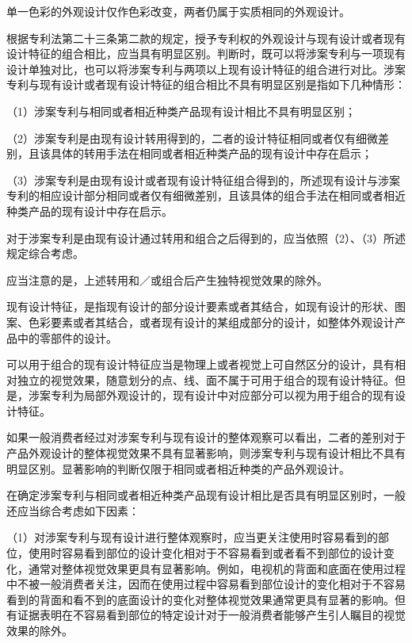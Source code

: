 单一色彩的外观设计仅作色彩改变，两者仍属于实质相同的外观设计。

根据专利法第二十三条第二款的规定，授予专利权的外观设计与现有设计或者现有设计特征的组合相比，应当具有明显区别。判断时，既可以将涉案专利与一项现有设计单独对比，也可以将涉案专利与两项以上现有设计特征的组合进行对比。涉案专利与现有设计或者现有设计特征的组合相比不具有明显区别是指如下几种情形：

{\setlength{\parindent}{17.1bp}（1）涉案专利与相同或者相近种类产品现有设计相比不具有明显区别；\par}

{\setlength{\parindent}{17.1bp}（2）涉案专利是由现有设计转用得到的，二者的设计特征相同或者仅有细微差别，且该具体的转用手法在相同或者相近种类产品的现有设计中存在启示；\par}

{\setlength{\parindent}{17.1bp}（3）涉案专利是由现有设计或者现有设计特征组合得到的，所述现有设计与涉案专利的相应设计部分相同或者仅有细微差别，且该具体的组合手法在相同或者相近种类产品的现有设计中存在启示。\par}

对于涉案专利是由现有设计通过转用和组合之后得到的，应当依照（2）、（3）所述规定综合考虑。

应当注意的是，上述转用和／或组合后产生独特视觉效果的除外。

现有设计特征，是指现有设计的部分设计要素或者其结合，如现有设计的形状、图案、色彩要素或者其结合，或者现有设计的某组成部分的设计，如整体外观设计产品中的零部件的设计。

可以用于组合的现有设计特征应当是物理上或者视觉上可自然区分的设计，具有相对独立的视觉效果，随意划分的点、线、面不属于可用于组合的现有设计特征。但是，涉案专利为局部外观设计的，现有设计中对应部分可以视为用于组合的现有设计特征。

如果一般消费者经过对涉案专利与现有设计的整体观察可以看出，二者的差别对于产品外观设计的整体视觉效果不具有显著影响，则涉案专利与现有设计相比不具有明显区别。显著影响的判断仅限于相同或者相近种类的产品外观设计。

在确定涉案专利与相同或者相近种类产品现有设计相比是否具有明显区别时，一般还应当综合考虑如下因素：

{\setlength{\parindent}{17.1bp}（1）对涉案专利与现有设计进行整体观察时，应当更关注使用时容易看到的部位，使用时容易看到部位的设计变化相对于不容易看到或者看不到部位的设计变化，通常对整体视觉效果更具有显著影响。例如，电视机的背面和底面在使用过程中不被一般消费者关注，因而在使用过程中容易看到部位设计的变化相对于不容易看到的背面和看不到的底面设计的变化对整体视觉效果通常更具有显著的影响。但有证据表明在不容易看到部位的特定设计对于一般消费者能够产生引人瞩目的视觉效果的除外。\par}

